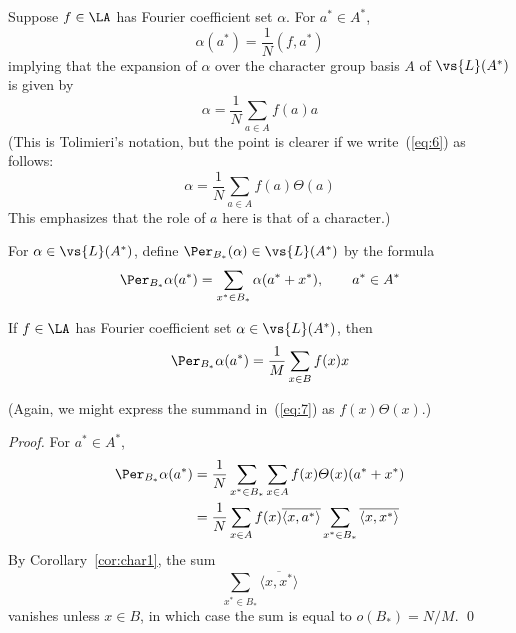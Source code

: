 Suppose $f \in \LA$ has Fourier coefficient  set $\alpha$. For $a^* \in A^*$,
\[
\alpha(a^*) = \frac{1}{N} (f,a^*)
\]
implying that the expansion of $\alpha$ over the character group basis $A$ of
$\vs{L}(A^*)$ is given by 
\begin{equation}\label{eq:6}
\alpha = \frac{1}{N} \sum_{a\in A}f(a)a
\end{equation}
(This is Tolimieri's notation, but the point is clearer
if we write~(\ref{eq:6}) as follows:
\[
\alpha = \frac{1}{N} \sum_{a\in A}f(a)\varTheta(a)
\]
This emphasizes that the role of $a$ here is that of a character.)

For $\alpha \in \vs{L}(A^*)$, define $\Per_{B_*}(\alpha)\in \vs{L}(A^*)$
by the formula
\[
\Per_{B_*}\alpha(a^*) = \sum_{x^*\in B_*} \alpha(a^*+x^*), \qquad a^*\in A^*
\]
\begin{theorem}
If $f\in \LA$ has Fourier coefficient set $\alpha\in \vs{L}(A^*)$, then 
\begin{equation}\label{eq:7}
\Per_{B_*}\alpha(a^*) = \frac{1}{M}\sum_{x\in B} f(x)x
\end{equation}
\end{theorem}
(Again, we might express the summand in~(\ref{eq:7}) as $f(x) \varTheta(x)$.)
\begin{proof}
For $a^* \in A^*$,
\begin{align*}
\Per_{B_*}\alpha(a^*) 
&= \frac{1}{N}\sum_{x^*\in B_*}\sum_{x\in A} f(x)\varTheta(x)(a^*+x^*)\\
&= \frac{1}{N}\sum_{x\in A} f(x)\overline{\langle x,a^*\rangle}
\sum_{x^*\in B_*}\overline{\langle x,x^*\rangle}
\end{align*}
By Corollary~\ref{cor:char1}, the sum
\[
\sum_{x^*\in B_*}\overline{\langle x,x^*\rangle}
\]
vanishes unless $x\in B$, in which case the sum is equal to $o(B_*) = N/M$. \qed
\end{proof}



